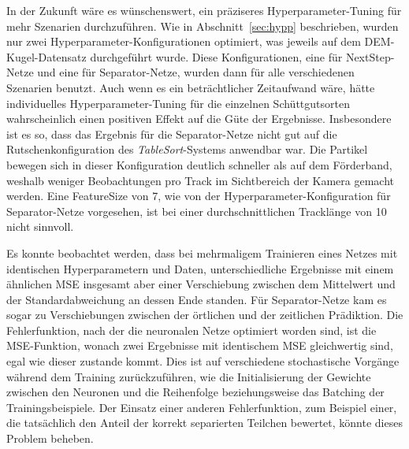 In der Zukunft wäre es wünschenswert, ein präziseres Hyperparameter-Tuning für mehr Szenarien durchzuführen.
Wie in Abschnitt~\ref{sec:hypp} beschrieben, wurden nur zwei Hyperparameter-Konfigurationen optimiert, was jeweils auf dem DEM-Kugel-Datensatz durchgeführt wurde.
Diese Konfigurationen, eine für NextStep-Netze und eine für Separator-Netze,  wurden dann für alle verschiedenen Szenarien benutzt.
Auch wenn es ein beträchtlicher Zeitaufwand wäre, hätte individuelles Hyperparameter-Tuning für die einzelnen Schüttgutsorten wahrscheinlich einen positiven Effekt auf die Güte der Ergebnisse.
Insbesondere ist es so, dass das Ergebnis für die Separator-Netze nicht gut auf die Rutschenkonfiguration des \textit{TableSort}-Systems anwendbar war.
Die Partikel bewegen sich in dieser Konfiguration deutlich schneller als auf dem Förderband, weshalb weniger Beobachtungen pro Track im Sichtbereich der Kamera gemacht werden.
Eine FeatureSize von 7, wie von der Hyperparameter-Konfiguration für Separator-Netze vorgesehen, ist bei einer durchschnittlichen Tracklänge von 10 nicht sinnvoll.



Es konnte beobachtet werden, dass bei mehrmaligem Trainieren eines Netzes 
mit identischen Hyperparametern und Daten, unterschiedliche Ergebnisse mit einem ähnlichen MSE insgesamt aber einer Verschiebung zwischen dem Mittelwert und der Standardabweichung  
an dessen Ende standen.
Für Separator-Netze kam es sogar zu Verschiebungen zwischen der örtlichen und der zeitlichen Prädiktion.
Die Fehlerfunktion, nach der die neuronalen Netze optimiert worden sind, ist die MSE-Funktion, wonach zwei Ergebnisse mit identischem MSE gleichwertig sind, egal wie dieser zustande kommt.
Dies ist auf verschiedene stochastische Vorgänge während dem Training zurückzuführen, wie die Initialisierung der Gewichte zwischen den Neuronen und die Reihenfolge beziehungsweise das Batching der Trainingsbeispiele.
Der Einsatz einer anderen Fehlerfunktion, zum Beispiel einer, die tatsächlich den Anteil der korrekt separierten Teilchen bewertet, könnte dieses Problem beheben.
